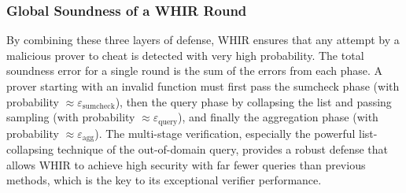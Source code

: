 \documentclass{article}
\begin{document}
\subsubsection{Global Soundness of a WHIR Round}
By combining these three layers of defense, WHIR ensures that any attempt by a malicious prover to cheat is detected with very high probability. The total soundness error for a single round is the sum of the errors from each phase. A prover starting with an invalid function must first pass the sumcheck phase (with probability $\approx \varepsilon_{\text{sumcheck}}$), then the query phase by collapsing the list and passing sampling (with probability $\approx \varepsilon_{\text{query}}$), and finally the aggregation phase (with probability $\approx \varepsilon_{\text{agg}}$). The multi-stage verification, especially the powerful list-collapsing technique of the out-of-domain query, provides a robust defense that allows WHIR to achieve high security with far fewer queries than previous methods, which is the key to its exceptional verifier performance.





\end{document}
